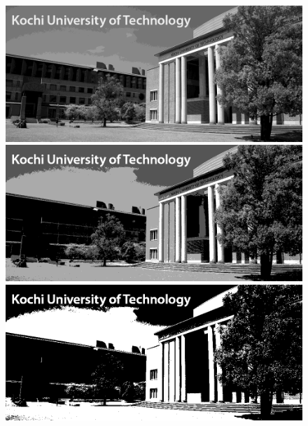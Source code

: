 \begin{figure}[H]
\begin{minipage}[b]{.23\textwidth}
    \end{minipage}
    \begin{minipage}[b]{.23\textwidth}
        \centering
        \includegraphics[keepaspectratio,width=\textwidth]{../../Figures/05_22_4bit.png}
    \end{minipage}
    \begin{minipage}[b]{.23\textwidth}
        \centering
        \includegraphics[keepaspectratio,width=\textwidth]{../../Figures/05_23_2bit.png}
    \end{minipage}
    \begin{minipage}[b]{.23\textwidth}
        \centering
        \includegraphics[keepaspectratio,width=\textwidth]{../../Figures/05_24_1bit.png}

\end{minipage}
\end{figure}
